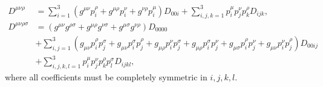 \documentclass[../main.tex]{subfiles}
\begin{document}
\begin{subequations}
\begin{align}
        D^{\mu\nu\rho}       & = \sum_{i=1}^3 (g^{\mu\nu} p_i^{\rho} + g^{\mu\rho} p_i^{\nu} + g^{\nu\rho} p_i^{\mu}) D_{00i} + \sum_{i,j,k=1}^3 p_i^\mu p_j^\nu p_k^\rho D_{ijk},                                                                    \\
        \nonumber
        D^{\mu\nu\rho\sigma} & = (g^{\mu\nu}g^{\rho\sigma} + g^{\mu\rho}g^{\nu\sigma} + g^{\mu\sigma}g^{\nu\rho})D_{0000}                                                                                                                             \\
        \nonumber
                             & + \sum_{i,j=1}^3 (g_{\mu\nu}p_i^\rho p_j^\sigma + g_{\mu\nu}p_i^\sigma p_j^\rho + g_{\mu\rho}p_i^\nu p_j^\sigma + g_{\mu\rho}p_i^\sigma p_j^\nu + g_{\mu\sigma}p_i^\rho p_j^\nu + g_{\mu\nu}p_i^\nu p_j^\rho) D_{00ij} \\
                             & + \sum_{i,j,k,l=1}^3 p_i^\mu p_j^\nu p_k^\rho p_l^\sigma D_{ijkl},
    \end{align}
\end{subequations}
where all coefficients must be completely symmetric in \(i,j,k,l\).
\end{document}
